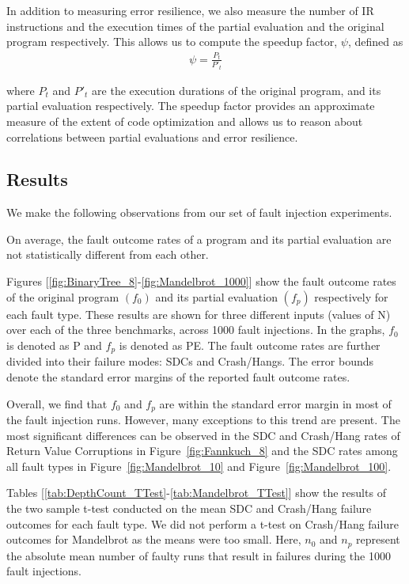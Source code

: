 In addition to measuring error resilience, we also measure the number of IR instructions and the execution times of the partial evaluation and the original program respectively.
This allows us to compute the speedup factor, $\psi$, defined as
\begin{align*}
\psi = \frac{P_t}{P'_t}
\end{align*}

where $P_t$ and $P'_t$ are the execution durations of the original program, and its partial evaluation respectively.
The speedup factor provides an approximate measure of the extent of code optimization and allows us to reason about correlations between partial evaluations and error resilience.


\subsection{Results}
\label{sec:results}

We make the following observations from our set of fault injection experiments.

\begin{obs}
  \label{obs:faultoutcomes}
  On average, the fault outcome rates of a program and its partial evaluation are not statistically different from each other.
\end{obs}

Figures [\ref{fig:BinaryTree_8}-\ref{fig:Mandelbrot_1000}] show the fault outcome rates of the original program $(f_0)$ and its partial evaluation $(f_p)$ respectively for each fault type.
These results are shown for three different inputs (values of N) over each of the three benchmarks, across 1000 fault injections.  
In the graphs, $f_0$ is denoted as P and $f_p$ is denoted as PE.
The fault outcome rates are further divided into their failure modes: SDCs and Crash/Hangs.
The error bounds denote the standard error margins of the reported fault outcome rates.

Overall, we find that $f_0$ and $f_p$ are within the standard error margin in most of the fault injection runs.
However, many exceptions to this trend are present.
The most significant differences can be observed in the SDC and Crash/Hang rates of Return Value Corruptions in Figure~\ref{fig:Fannkuch_8} and the SDC rates among all fault types in Figure~\ref{fig:Mandelbrot_10} and Figure~\ref{fig:Mandelbrot_100}.

Tables [\ref{tab:DepthCount_TTest}-\ref{tab:Mandelbrot_TTest}] show the results of the two sample t-test conducted on the mean SDC and Crash/Hang failure outcomes for each fault type.
We did not perform a t-test on Crash/Hang failure outcomes for Mandelbrot as the means were too small.
Here, $n_0$ and $n_p$ represent the absolute mean number of faulty runs that result in failures during the 1000 fault injections. 

